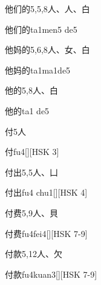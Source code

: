 \begin{Entry}{他们的}{5,5,8}{⼈、⼈、⽩}
  \begin{Phonetics}{他们的}{ta1men5 de5}
  \end{Phonetics}
\end{Entry}

\begin{Entry}{他妈的}{5,6,8}{⼈、⼥、⽩}
  \begin{Phonetics}{他妈的}{ta1ma1de5}
  \end{Phonetics}
\end{Entry}

\begin{Entry}{他的}{5,8}{⼈、⽩}
  \begin{Phonetics}{他的}{ta1 de5}
  \end{Phonetics}
\end{Entry}

\begin{Entry}{付}{5}{⼈}
  \begin{Phonetics}{付}{fu4}[][HSK 3]
  \end{Phonetics}
\end{Entry}

\begin{Entry}{付出}{5,5}{⼈、⼐}
  \begin{Phonetics}{付出}{fu4 chu1}[][HSK 4]
  \end{Phonetics}
\end{Entry}

\begin{Entry}{付费}{5,9}{⼈、⾙}
  \begin{Phonetics}{付费}{fu4fei4}[][HSK 7-9]
  \end{Phonetics}
\end{Entry}

\begin{Entry}{付款}{5,12}{⼈、⽋}
  \begin{Phonetics}{付款}{fu4kuan3}[][HSK 7-9]
  \end{Phonetics}
\end{Entry}

